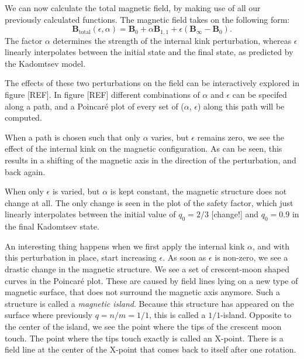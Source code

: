 \documentclass[%
superscriptaddress,
amsmath,amssymb,
aps,
pre,
floatfix,
]{revtex4-2}
\begin{document}
We can now calculate the total magnetic field, by making use of all our previously calculated functions. The magnetic field takes on the following form:
\begin{equation}\label{eq:totalfield}
    \mathbf{B}_{\text{total}}(\epsilon,\alpha) =  \mathbf{B}_0 + \alpha \mathbf{B}_{1,1}+ \epsilon (\mathbf{B}_\infty -\mathbf{B}_0). 
\end{equation}
The factor $\alpha$ determines the strength of the internal kink perturbation, whereas $\epsilon$ linearly interpolates between the initial state and the final state, as predicted by the Kadomtsev model. 

The effects of these two perturbations on the field can be interactively explored in figure [REF]. 
In figure [REF] different combinations of $\alpha$ and $\epsilon$ can be specifed along a path, and a Poincar\'e plot of every set of ($\alpha$, $\epsilon$) along this path will be computed. 

When a path is chosen such that only $\alpha$ varies, but $\epsilon$ remains zero, we see the effect of the internal kink on the magnetic configuration. 
As can be seen, this results in a shifting of the magnetic axis in the direction of the perturbation, and back again. 

When only $\epsilon$ is varied, but $\alpha$ is kept constant, the magnetic structure does not change at all. 
The only change is seen in the plot of the safety factor, which just linearly interpolates between the initial value of $q_0=2/3$ [change!] and $q_0=0.9$ in the final Kadomtsev state. 

An interesting thing happens when we first apply the internal kink $\alpha$, and with this perturbation in place, start increasing $\epsilon$. 
As soon as $\epsilon$ is non-zero, we see a drastic change in the magnetic structure. 
We see a set of crescent-moon shaped curves in the Poincar\'e plot. 
These are caused by field lines lying on a new type of magnetic surface, that does not surround the magnetic axis anymore. 
Such a structure is called a \emph{magnetic island}. 
Because this structure has appeared on the surface where previously $q=n/m=1/1$, this is called a $1/1$-island. 
Opposite to the center of the island, we see the point where the tips of the crescent moon touch. 
The point where the tips touch exactly is called an X-point. 
There is a field line at the center of the X-point that comes back to itself after one rotation. 
\end{document}
